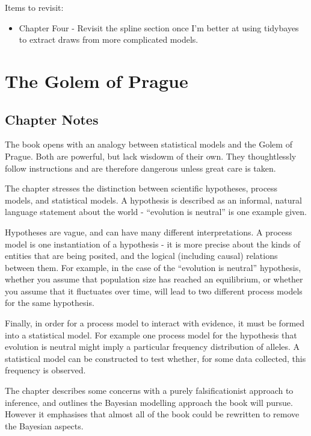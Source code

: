 \documentclass[
]{book}
\providecommand{\tightlist}{%
  \setlength{\itemsep}{0pt}\setlength{\parskip}{0pt}}
\begin{document}
Items to revisit:

\begin{itemize}
\tightlist
\item
  Chapter Four - Revisit the spline section once I'm better at using tidybayes to extract draws from more complicated models.
\end{itemize}

\hypertarget{prague}{%
\chapter{The Golem of Prague}\label{prague}}

\hypertarget{chapter-notes}{%
\section{Chapter Notes}\label{chapter-notes}}

The book opens with an analogy between statistical models and the Golem of Prague. Both are powerful, but lack wisdowm of their own. They thoughtlessly follow instructions and are therefore dangerous unless great care is taken.

The chapter stresses the distinction between scientific hypotheses, process models, and statistical models. A hypothesis is described as an informal, natural language statement about the world - ``evolution is neutral'' is one example given.

Hypotheses are vague, and can have many different interpretations. A process model is one instantiation of a hypothesis - it is more precise about the kinds of entities that are being posited, and the logical (including causal) relations between them. For example, in the case of the ``evolution is neutral'' hypothesis, whether you assume that population size has reached an equilibrium, or whether you assume that it fluctuates over time, will lead to two different process models for the same hypothesis.

Finally, in order for a process model to interact with evidence, it must be formed into a statistical model. For example one process model for the hypothesis that evolution is neutral might imply a particular frequency distribution of alleles. A statistical model can be constructed to test whether, for some data collected, this frequency is observed.

The chapter describes some concerns with a purely falsificationist approach to inference, and outlines the Bayesian modelling approach the book will pursue. However it emphasises that almost all of the book could be rewritten to remove the Bayesian aspects.
\end{document}
